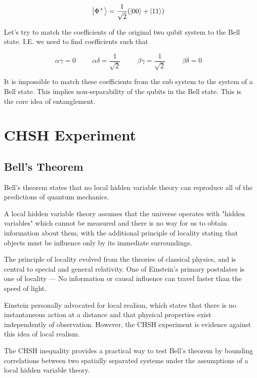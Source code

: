\documentclass[12pt]{article}
\begin{document}
$$
\ket{\Phi^+} = \frac{1}{\sqrt{2}} ( \ket{00} + \ket{11} )
$$

Let's try to match the coefficients of the original two qubit system to the Bell state. I.E. we need to find coefficients such that

$$
\alpha\gamma = 0 \hspace{1cm} \alpha\delta=\frac{1}{\sqrt{2}} \hspace{1cm}
\beta\gamma=\frac{1}{\sqrt{2}}\hspace{1cm}
\beta\delta = 0
$$

It is impossible to match these coefficients from the sub system to the system of a Bell state. This implies non-separability of the qubits in the Bell state. This is the core idea of entanglement. 

\newpage
\section{CHSH Experiment}

\subsection{Bell's Theorem}

Bell's theorem states that no local hidden variable theory can reproduce all of the predictions of quantum mechanics. \cite{Bell1964}

A local hidden variable theory assumes that the universe operates with "hidden variables" which cannot be measured and there is no way for us to obtain information about them, with the additional principle of locality stating that objects must be influence only by its immediate surroundings.

The principle of locality evolved from the theories of classical physics, and is central to special and general relativity. One of Einstein's primary postulates is one of locality — No information or causal influence can travel faster than the speed of light.

Einstein personally advocated for local realism, which states that there is no instantaneous action at a distance and that physical properties exist independently of observation. However, the CHSH experiment is evidence against this idea of local realism.

The CHSH inequality provides a practical way to test Bell's theorem by bounding correlations between two spatially separated systems under the assumptions of a local hidden variable theory. \cite{CHSH1969}
\end{document}
